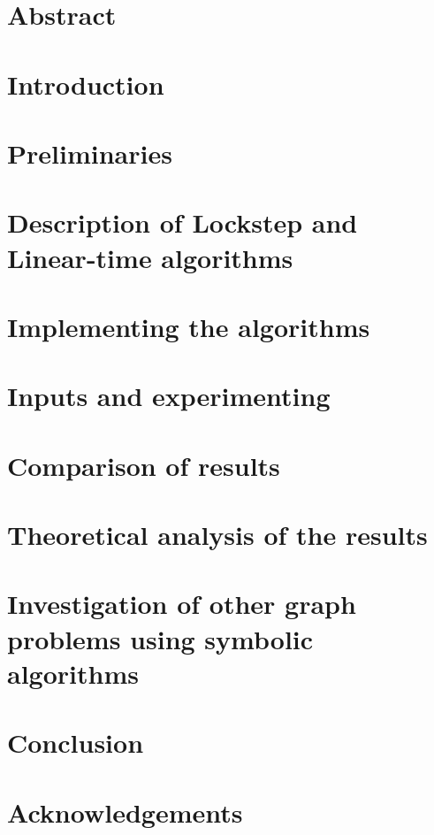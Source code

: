 \documentclass[a4, english]{article}
\title{\titlecontent}
\author{Magdalena Kalin-Czerska}
\author{Mikael Bisgaard Dahlsen-Jensen}
\affil{Aarhus University}
\newcommand{\sectionpath}{../sections/}
\begin{document}
 \pagestyle{empty}

\maketitle

\newpage

\section{Abstract}

\section{Introduction}

\section{Preliminaries}

\section{Description of  Lockstep and Linear-time algorithms}

\section{Implementing the algorithms}


\section{Inputs and experimenting}


\section{Comparison of results}

\section{Theoretical analysis of the results}

\section{Investigation of other graph problems using symbolic algorithms}

\section{Conclusion}

\section{Acknowledgements}

\printbibliography
\appendix
\end{document}

